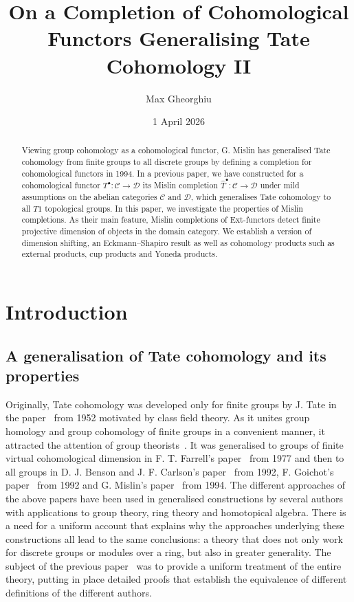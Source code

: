 \documentclass[12pt, a4paper]{article}
\title{On a Completion of Cohomological Functors Generalising Tate Cohomology II}
\author{Max Gheorghiu}
\date{1 April 2026}
\numberwithin{equation}{section}
\theoremstyle{empty}
\theoremstyle{nonumberplain}
\begin{document}
\setlength{\parindent}{0cm}

\maketitle

\begin{abstract}
Viewing group cohomology as a cohomological functor, G.\! Mislin has generalised Tate cohomology from finite groups to all discrete groups by defining a completion for cohomological functors in 1994. In a previous paper, we have constructed for a cohomological functor $T^{\bullet}: \mathcal{C} \rightarrow \mathcal{D}$ its Mislin completion $\widehat{T}^{\bullet}: \mathcal{C} \rightarrow \mathcal{D}$ under mild assumptions on the abelian categories $\mathcal{C}$ and $\mathcal{D}$, which generalises Tate cohomology to all $T1$ topological groups. In this paper, we investigate the properties of Mislin completions. As their main feature, Mislin completions of Ext-functors detect finite projective dimension of objects in the domain category. We establish a version of dimension shifting, an Eckmann--Shapiro result as well as cohomology products such as external products, cup products and Yoneda products.
\end{abstract}

\tableofcontents

\section{Introduction}\label{sec:intro}

\subsection{A generalisation of Tate cohomology and its properties}\label{subsec:expo}

Originally, Tate cohomology was developed only for finite groups by J.\! Tate in the paper~\cite{tat52} from 1952 motivated by class field theory. As it unites group homology and group cohomology of finite groups in a convenient manner, it attracted the attention of group theorists~\cite[p.~128]{bro82}. It was generalised to groups of finite virtual cohomological dimension in F.\! T.\! Farrell's paper~\cite{far77} from 1977 and then to all groups in D.\! J.\! Benson and J.\! F.\! Carlson's paper~\cite{ben92} from 1992, F.\! Goichot's paper~\cite{goi92} from 1992 and G.\! Mislin's paper~\cite{mis94} from 1994. The different approaches of the above papers have been used in generalised constructions by several authors with applications to group theory, ring theory and homotopical algebra. There is a need for a uniform account that explains why the approaches underlying these constructions all lead to the same conclusions: a theory that does not only work for discrete groups or modules over a ring, but also in greater generality. The subject of the previous paper~\cite{ghe24} was to provide a uniform treatment of the entire theory, putting in place detailed proofs that establish the equivalence of different definitions of the different authors. \\
\end{document}
